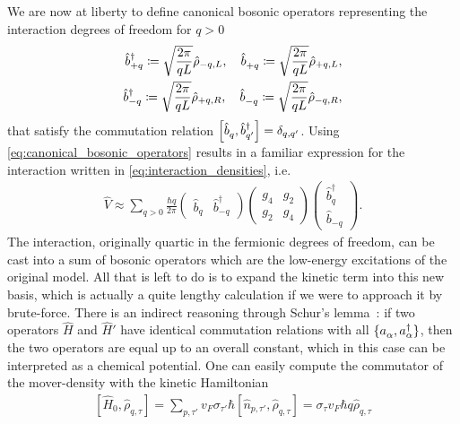 \documentclass{svmono}
\def\pdag{{\vphantom\dag}}
\newcommand{\commutator}[1]{\left[ #1 \right]}
\begin{document}
We are now at liberty to define canonical bosonic operators representing the interaction degrees of freedom for $q>0$
\begin{align}
    \hat b^\dag_{+q} \coloneqq \sqrt\frac{2\pi}{qL}\hat\rho_{-q,L},
    \quad
    \hat b^\pdag_{+q} \coloneqq \sqrt\frac{2\pi}{qL}\hat\rho_{+q,L},
    \\
    \hat b^\dag_{-q} \coloneqq \sqrt\frac{2\pi}{qL}\hat\rho_{+q,R},
    \quad
    \hat b^\pdag_{-q} \coloneqq \sqrt\frac{2\pi}{qL}\hat\rho_{-q,R},
    \label{eq:canonical_bosonic_operators}
\end{align}
that satisfy the commutation relation $\commutator{\hat b_q^\pdag,\hat b_{q'}^\dag} = \delta_{q,q'}$.
Using \cref{eq:canonical_bosonic_operators} results in a familiar expression for the interaction written in \cref{eq:interaction_densities}, i.e.
\begin{align}
    \hat V \approx\sum_{q>0}\frac{\hbar q}{2\pi}
    \begin{pmatrix}
        \hat b_q & \hat b^\dag_{-q}
    \end{pmatrix}
    \begin{pmatrix}
        g_4 & g_2 \\
        g_2 & g_4
    \end{pmatrix}
    \begin{pmatrix}
        \hat b^\dag_q \\ \hat b_{-q}
    \end{pmatrix}
    .
    \label{eq:quadratic_interactions}
\end{align}
The interaction, originally quartic in the fermionic degrees of freedom, can be cast into a sum of bosonic operators which are the low-energy excitations of the original model.
All that is left to do is to expand the kinetic term into this new basis, which is actually a quite lengthy calculation if we were to approach it by brute-force.
There is an indirect reasoning through Schur's lemma~\cite{schur_neue_1905}: if two operators $\hat H$ and $\hat H'$ have identical commutation relations with all $\{a^\pdag_\alpha,a^\dag_\alpha\}$, then the two operators are equal up to an overall constant, which in this case can be interpreted as a chemical potential.
One can easily compute the commutator of the mover-density with the kinetic Hamiltonian
\begin{align}
    \commutator{\hat H_0, \hat\rho_{q,\tau}}
    =
    \sum_{p,\tau'}v_F\sigma_{\tau'}\hbar \commutator{\hat n_{p,\tau'},\hat\rho_{q,\tau}}
    =
    \sigma_\tau v_F \hbar q \hat\rho_{q,\tau}
\end{align}
\end{document}
